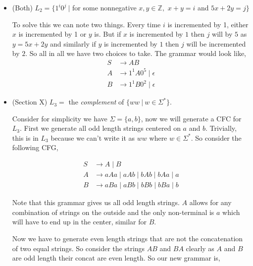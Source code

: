 \documentclass[11pt]{article}
\begin{document}
\begin{enumerate}
\begin {itemize}
\begin{answer}

\end{answer}

\item (Both) $L_2 = \{1^i0^j\ |$ for some nonnegative $x,y \in \mathbb{Z}, $ $x+y = i$ and $5x+2y = j\}$

\begin{answer}
  To solve this we can note two things. Every time $i$ is incremented by 1, either $x$ is incremented by 1 or $y$ is. But if $x$ is incremented by $1$ then $j$ will by $5$ as $y = 5x + 2y$ and similarly if $y$ is incremented by $1$ then $j$ will be incremented by $2$. So all in all we have two choices to take. The grammar would look like,
  \begin{align*}
    S &\to AB\\
    A & \to 1^{1} A 0^{5} \mid \epsilon\\
    B &\to 1^{1} B 0^{2} \mid \epsilon
  \end{align*}
\end{answer}
    
\item (Section X) $L_3 =$ the \textit{complement} of $\{ww\ |\ w \in \Sigma^*\}$. 

\begin{answer}
  Consider for simplicity we have $\Sigma = \{a, b\}$, now we will generate a CFC for $L_{3}$. First we generate all odd length strings centered on $a$ and $b$. Trivially, this is in $L_{3}$ because we can't write it as $ww$ where $w \in \Sigma^*$. So consider the following CFG, 
  
  \begin{align*}
    S &\to A \mid B\\
    A &\to aAa \mid aAb \mid bAb \mid bAa \mid a\\
    B &\to aBa \mid aBb \mid bBb \mid bBa \mid b
  \end{align*}

  Note that this grammar gives us all odd length strings. $A$ allows for any combination of strings on the outside and the only non-terminal is $a$ which will have to end up in the center, similar for $B$.

  \vspace{1em}
  
  Now we have to generate even length strings that are not the concatenation of two equal strings. So consider the strings $AB$ and $BA$ clearly as $A$ and $B$ are odd length their concat are even length. So our new grammar is, 
  

\end{answer}
\end{itemize}
\end{enumerate}
\end{document}

